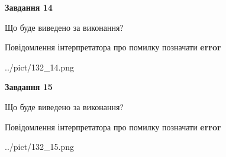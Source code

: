 \documentclass[11pt, ukrainian]{article}
\begin{document}
{\begin {large}
{\begin {center}\textbf{Завдання 14}\end {center}}\par
Що буде виведено за виконання? \par
Повідомлення інтерпретатора про помилку позначати \textbf{error}

\begin{center}
	{../pict/132_14.png}
\end{center}
\newpage

{\begin {center}\textbf{Завдання 15}\end {center}}\par
Що буде виведено за виконання? \par
Повідомлення інтерпретатора про помилку позначати \textbf{error}

\begin{center}
	{../pict/132_15.png}
\end{center}
\newpage

\end {large}}
\end{document}
